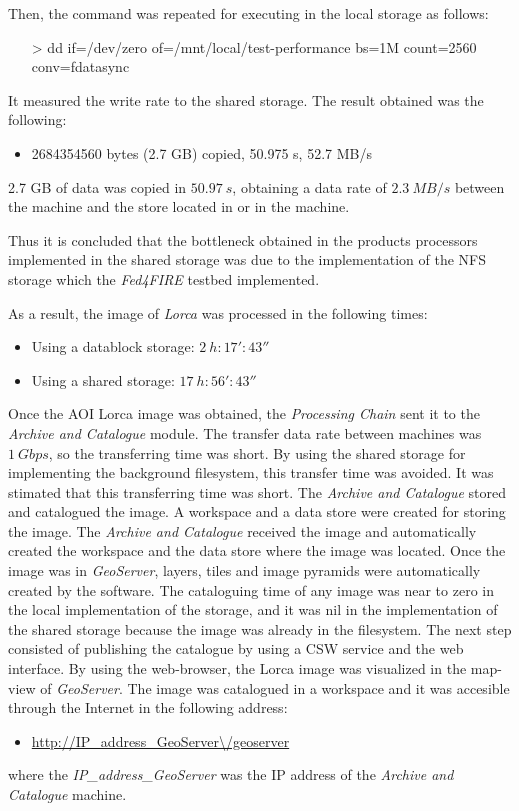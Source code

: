 Then, the command was repeated for executing in the local storage as follows:
\begin{itemize}
\item[>] dd if=/dev/zero of=/mnt/local/test-performance bs=1M count=2560
  conv=fdatasync
\end{itemize}

It measured the write rate to the shared storage. The result obtained was the
following:
\begin{itemize}
\item 2684354560 bytes (2.7 GB) copied, 50.975 s, 52.7 MB/s
\end{itemize}
2.7 GB of data was copied in $50.97~s$, obtaining a data rate  of $2.3~MB/s$ between the \bonfire machine and
the store located in  \bonfire or in the machine.

Thus it is concluded that the bottleneck obtained in the products processors
implemented in the shared storage was due to the implementation of the \ac{NFS}
storage which the
\emph{Fed4FIRE} testbed implemented.

As a result, the image of \emph{Lorca} was processed in the following
times:
\begin{itemize}
\item Using a datablock storage: $2~h:17':43''$
\item Using a shared storage: $17~h:56':43''$
\end{itemize}


Once the \ac{AOI} Lorca image was obtained, the \emph{Processing Chain} sent it
to the \emph{Archive and Catalogue} module. The transfer data rate between
\bonfire machines was $1~Gbps$, so the transferring time was short. By using the shared storage for
implementing the background filesystem, this transfer time was avoided. It was
stimated that this transferring time was short. The \emph{Archive
  and Catalogue} stored and catalogued the image. A workspace and a data store
were created for storing the image. The \emph{Archive and Catalogue} received
the image and automatically created the workspace and the data store where the
image was located. Once the image was in \emph{GeoServer},
layers, tiles and image pyramids were automatically created by the software. The cataloguing time of any image
was near to zero in the local implementation of the storage, and it was nil in the implementation of the shared
storage because the image was already in the filesystem. 
The next step consisted of publishing the catalogue by using
a \ac{CSW} service and the web interface. By using the web-browser, the Lorca
image was visualized in the map-view of \emph{GeoServer}. The image was
catalogued in a workspace and it was accesible through the Internet in the
following address:
\begin{itemize}
\item \url{http://IP\_address\_GeoServer\/geoserver}
\end{itemize}
where the \emph{IP\_address\_GeoServer} was the \ac{IP} address of the
\emph{Archive and Catalogue} machine.

